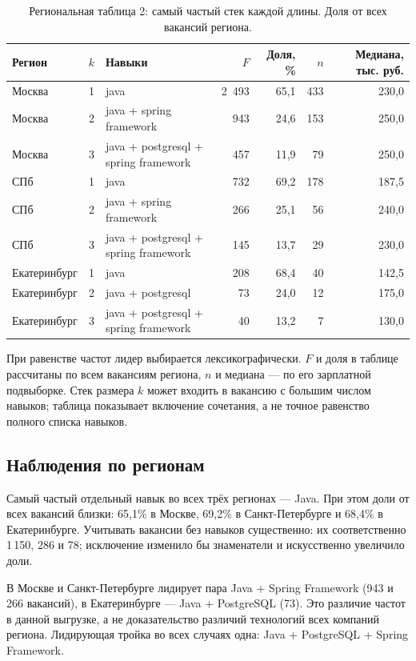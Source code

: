 \documentclass[11pt,a4paper]{article}
\begin{document}
\begin{table}[h!]
\centering\small
\caption{Региональная таблица 2: самый частый стек каждой длины. Доля от всех вакансий региона.}
\begin{tabularx}{\linewidth}{lr>{\raggedright\arraybackslash}Xrrrr}\toprule
Регион & $k$ & Навыки & $F$ & Доля, \% & $n$ & Медиана, тыс. руб.\\\midrule
Москва & 1 & java & 2~493 & 65,1 & 433 & 230,0\\
Москва & 2 & java + spring framework & 943 & 24,6 & 153 & 250,0\\
Москва & 3 & java + postgresql + spring framework & 457 & 11,9 & 79 & 250,0\\
СПб & 1 & java & 732 & 69,2 & 178 & 187,5\\
СПб & 2 & java + spring framework & 266 & 25,1 & 56 & 240,0\\
СПб & 3 & java + postgresql + spring framework & 145 & 13,7 & 29 & 230,0\\
Екатеринбург & 1 & java & 208 & 68,4 & 40 & 142,5\\
Екатеринбург & 2 & java + postgresql & 73 & 24,0 & 12 & 175,0\\
Екатеринбург & 3 & java + postgresql + spring framework & 40 & 13,2 & 7 & 130,0\\
\bottomrule\end{tabularx}
\end{table}

При равенстве частот лидер выбирается лексикографически. $F$ и доля в таблице~\thetable{} рассчитаны по всем вакансиям региона, $n$ и медиана --- по его зарплатной подвыборке. Стек размера $k$ может входить в вакансию с большим числом навыков; таблица показывает включение сочетания, а не точное равенство полного списка навыков.

\clearpage
\subsection*{Наблюдения по регионам}
Самый частый отдельный навык во всех трёх регионах --- Java. При этом доли от всех вакансий близки: 65,1\% в Москве, 69,2\% в Санкт-Петербурге и 68,4\% в Екатеринбурге. Учитывать вакансии без навыков существенно: их соответственно 1\,150, 286 и 78; исключение изменило бы знаменатели и искусственно увеличило доли.

В Москве и Санкт-Петербурге лидирует пара Java + Spring Framework (943 и 266 вакансий), в Екатеринбурге --- Java + PostgreSQL (73). Это различие частот в данной выгрузке, а не доказательство различий технологий всех компаний региона. Лидирующая тройка во всех случаях одна: Java + PostgreSQL + Spring Framework.
\end{document}
